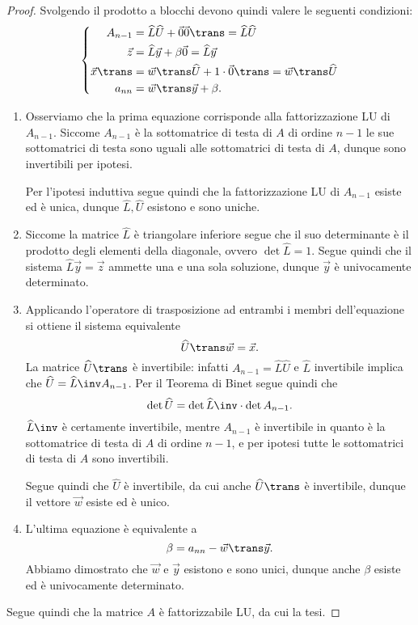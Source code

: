 \begin{proof}
    Svolgendo il prodotto a blocchi devono quindi valere le seguenti condizioni: \[
        \left\{
            \!\!\!\!\!\!\!
            \begin{aligned}
                &&A_{n-1} &= \widehat{L}\widehat{U} + \vec 0\vec 0\trans = \widehat{L}\widehat{U} \\
                &&\vec z &= \widehat{L}\vec y + \beta\vec 0 = \widehat{L}\vec y\\
                &&\vec x\trans &= \vec w\trans \widehat{U} + 1\cdot \vec 0\trans = \vec w\trans \widehat{U}\\
                &&a_{nn} &= \vec w\trans \vec y + \beta.
            \end{aligned}
        \right.
    \]

    \begin{enumerate}[(1)]
        \item Osserviamo che la prima equazione corrisponde alla fattorizzazione LU di $A_{n-1}$. 
        Siccome $A_{n-1}$ è la sottomatrice di testa di $A$ di ordine $n-1$ le sue sottomatrici di testa sono uguali alle sottomatrici di testa di $A$, dunque sono invertibili per ipotesi.   

        Per l'ipotesi induttiva segue quindi che la fattorizzazione LU di $A_{n-1}$ esiste ed è unica, dunque $\widehat{L}, \widehat{U}$ esistono e sono uniche.
        \item Siccome la matrice $\widehat{L}$ è triangolare inferiore segue che il suo determinante è il prodotto degli elementi della diagonale, ovvero $\det \widehat{L} = 1$. Segue quindi che il sistema $\widehat{L}\vec y = \vec z$ ammette una e una sola soluzione, dunque $\vec y$ è univocamente determinato.  
        \item Applicando l'operatore di trasposizione ad entrambi i membri dell'equazione si ottiene il sistema equivalente \[
            \widehat{U}\trans \vec w = \vec x.
        \] La matrice $\widehat{U}\trans$ è invertibile: infatti $A_{n-1} = \widehat{L}\widehat{U}$ e $\widehat{L}$ invertibile implica che $\widehat{U} = \widehat{L}\inv A_{n-1}$. Per il Teorema di Binet segue quindi che \[
            \det \widehat{U} = \det \widehat{L}\inv \cdot \det A_{n-1}.
        \] $\widehat{L}\inv$ è certamente invertibile, mentre $A_{n-1}$ è invertibile in quanto è la sottomatrice di testa di $A$ di ordine $n-1$, e per ipotesi tutte le sottomatrici di testa di $A$ sono invertibili.

        Segue quindi che $\widehat{U}$ è invertibile, da cui anche $\widehat{U}\trans$ è invertibile, dunque il vettore $\vec w$ esiste ed è unico.
        \item L'ultima equazione è equivalente a \[
            \beta = a_{nn} - \vec w\trans\vec y.
        \] Abbiamo dimostrato che $\vec w$ e $\vec y$ esistono e sono unici, dunque anche $\beta$ esiste ed è univocamente determinato.
    \end{enumerate}

    Segue quindi che la matrice $A$ è fattorizzabile LU, da cui la tesi.
\end{proof}